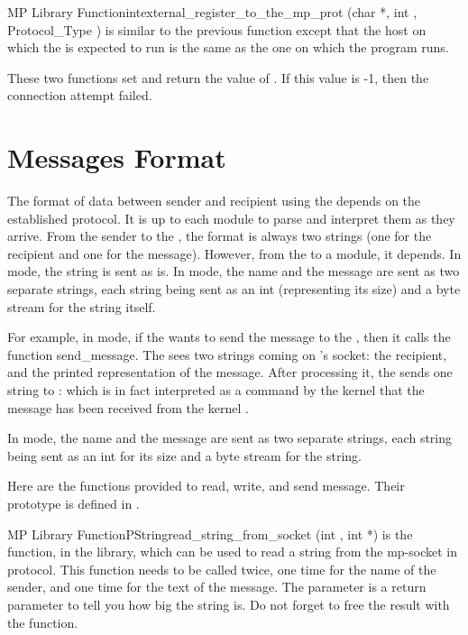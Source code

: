 \begin{typefn}{MP Library Function}{int}{external\_register\_to\_the\_mp\_prot}
        {(char *,  int , Protocol\_Type )}
is similar to the previous function except that the host on which the
\MPA{} is expected to run is the same as the one on which the
program runs.
\end{typefn}

These two functions set and return the value of . If this value
is -1, then the connection attempt failed.

\section{Messages Format}

The format of data between sender and recipient using the \MPA{} depends on the
established protocol. It is up to each module to parse and interpret them as
they arrive. From the sender to the \MPA{}, the format is always two strings
(one for the recipient and one for the message). However, from the \MPA{} to a
module, it depends. In  mode, the string  is sent as is. In  mode, the name and
the message are sent as two separate strings, each string being sent as an int
(representing its size) and a byte stream for the string itself.

For example, in  mode, if the \CPK{}  wants to send
the message  to the \CPK{} , then it
calls the function send\_message. The \MPA{} sees two strings coming on
's socket: \*  the recipient, and  the printed representation of the message. After processing it, the
\MPA{} sends one string to : \*  which is in fact interpreted as a command by the  kernel
that the message  has been received from the
kernel .

In  mode, the name and the message are sent as two separate
strings, each string being sent as an int for its size and a byte stream for
the string.

Here are the functions provided to read, write, and send message. Their
prototype is defined in .

\begin{typefn}{MP Library Function}{PString}{read\_string\_from\_socket}
        {(int , int *)}
is the function, in the  library, which can be used to read a
string from the mp-socket in  protocol. This function needs to be
called twice, one time for the name of the sender, and one time for the text of
the message. The  parameter is a return parameter to tell you how big
the string is.  Do not forget to free the result with the  function.
\end{typefn}

